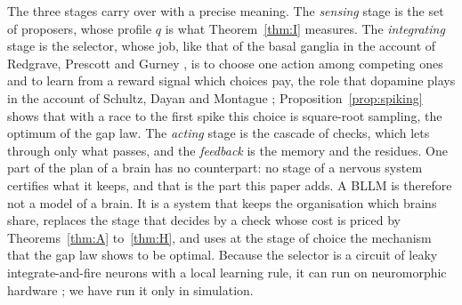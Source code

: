 The three stages carry over with a precise meaning. The \emph{sensing} stage is the set of proposers, whose profile $q$ is what Theorem~\ref{thm:I} measures. The \emph{integrating} stage is the selector, whose job, like that of the basal ganglia in the account of Redgrave, Prescott and Gurney \cite{RPG99}, is to choose one action among competing ones and to learn from a reward signal which choices pay, the role that dopamine plays in the account of Schultz, Dayan and Montague \cite{SDM97}; Proposition~\ref{prop:spiking} shows that with a race to the first spike this choice is square-root sampling, the optimum of the gap law. The \emph{acting} stage is the cascade of checks, which lets through only what passes, and the \emph{feedback} is the memory and the residues. One part of the plan of a brain has no counterpart: no stage of a nervous system certifies what it keeps, and that is the part this paper adds. A BLLM is therefore not a model of a brain. It is a system that keeps the organisation which brains share, replaces the stage that decides by a check whose cost is priced by Theorems~\ref{thm:A} to~\ref{thm:H}, and uses at the stage of choice the mechanism that the gap law shows to be optimal. Because the selector is a circuit of leaky integrate-and-fire neurons with a local learning rule, it can run on neuromorphic hardware \cite{Mea90,DSL18}; we have run it only in simulation.
